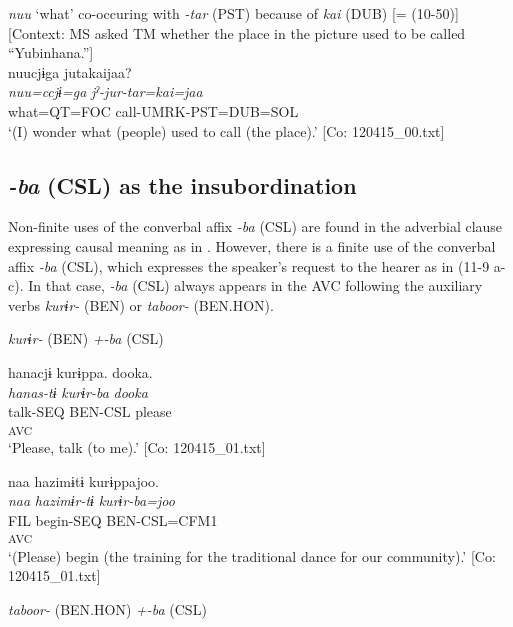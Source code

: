 \ea\label{ex:11-8}  \textit{nuu} ‘what’ co-occuring with \textit{{}-tar} (PST) because of \textit{kai} (DUB) [= (10-50)]   [Context: MS asked TM whether the place in the picture used to be called “Yubinhana.”]\\
  
      \glll    nuucjɨga  jutakaijaa?\\
    \textit{nuu=ccjɨ=ga}  \textit{jˀ-jur-tar=kai=jaa}\\
    what=QT=FOC  call-UMRK-PST=DUB=SOL\\
    \glt     ‘(I) wonder what (people) used to call (the place).’ [Co: 120415\_00.txt]
\z

\subsection{\textit{{}-ba} (CSL) as the insubordination}\label{sec:11.2.2}

Non-finite uses of the converbal affix \textit{-ba} (CSL) are found in the adverbial clause expressing causal meaning as in . However, there is a finite use of the converbal affix \textit{-ba} (CSL), which expresses the speaker’s request to the hearer as in (11-9 a-c). In that case, \textit{{}-ba} (CSL) always appears in the AVC following the auxiliary verbs \textit{kurɨr-} (BEN) or \textit{taboor-} (BEN.HON).

\ea\label{ex:11-9}  \textit{kurɨr-} (BEN) \textit{+-ba} (CSL)

  \ea  
      \gllll    hanacjɨ  kurɨppa.  dooka.\\
      \textit{hanas-tɨ}  \textit{kurɨr-ba}  \textit{dooka}\\
      talk-SEQ  BEN-CSL  please\\
      [Lex. verb  Aux. verb]\textsubscript{AVC}  \\
      \glt ‘Please, talk (to me).’      [Co: 120415\_01.txt]

  \ex  
      \gllll    naa  hazimɨtɨ  kurɨppajoo.\\
      \textit{naa}  \textit{hazimɨr-tɨ}  \textit{kurɨr-ba=joo}\\
      FIL  begin-SEQ  BEN-CSL=CFM1\\
        [Lex. verb  Aux. verb]\textsubscript{AVC}\\
     \glt  ‘(Please) begin (the training for the traditional dance for our community).’      [Co: 120415\_01.txt]

  \textit{taboor-} (BEN.HON) \textit{+-ba} (CSL)


